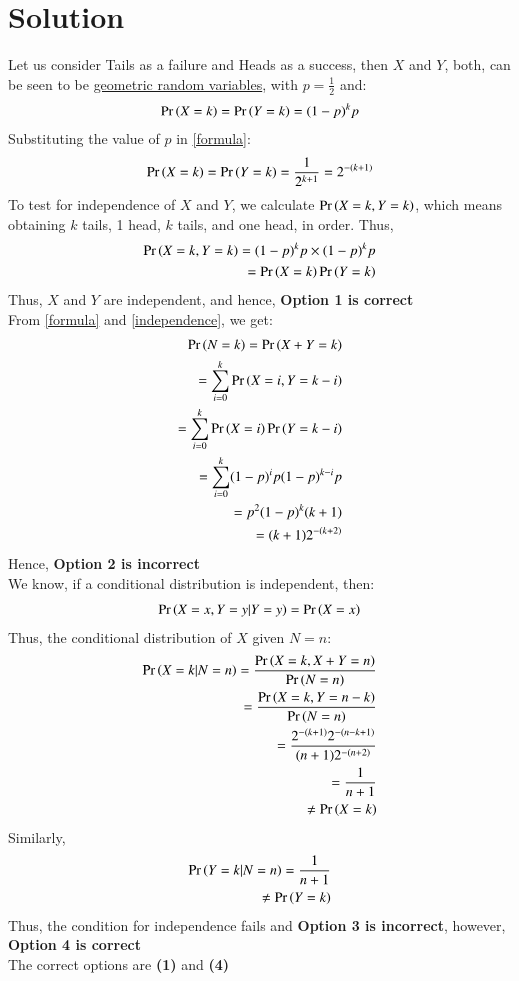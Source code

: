 \documentclass[journal,12pt,twocolumn]{IEEEtran}
\begin{document}
\section{Solution}
Let us consider Tails as a failure and Heads as a success, then $X$ and $Y$, both, can be seen to be \underline{geometric random variables}, with $p = \frac{1}{2}$ and:
\begin{align}
    \Pr\left(X = k\right) = \Pr\left(Y = k\right) = (1-p)^k p  
    \label{formula}
\end{align}
Substituting the value of $p$ in \eqref{formula}:
\begin{align}
    \Pr\left(X = k\right) = \Pr\left(Y = k\right) = \frac{1}{2^{k+1}} = 2^{-(k+1)}
\end{align}
To test for independence of $X$ and $Y$, we calculate $\Pr\left(X = k, Y = k\right)$, which means obtaining $k$ tails, 1 head, $k$ tails, and one head, in order. Thus,
\begin{align}
    \Pr\left(X = k,Y = k\right) = (1-p)^k p \times (1-p)^k p\\
    =\Pr\left(X = k\right)\Pr\left(Y = k\right)
    \label{independence}
    \end{align}
    Thus, $X$ and $Y$ are independent, and hence, \textbf{Option 1 is correct}\\
    From \eqref{formula} and \eqref{independence}, we get:
\begin{align}
    \Pr\left(N = k\right) = \Pr\left(X+Y = k\right)\\
    = \sum_{i=0}^k\Pr\left(X = i, Y = k-i\right) \\
    = \sum_{i=0}^k\Pr\left(X = i\right) \Pr\left(Y = k-i\right)\\
    =\sum_{i=0}^k (1-p)^i p (1-p)^{k-i} p\\
    = p^2(1-p)^k (k+1)\\
    =(k+1) 2^{-(k+2)}
\end{align}
Hence, \textbf{Option 2 is incorrect}\\
We know, if a conditional distribution is independent, then:
\begin{align}
    \Pr\left(X = x,Y=y | Y=y\right) = \Pr\left(X=x\right)
\end{align}
Thus, the conditional distribution of $X$ given $N=n$:
\begin{align}
    \Pr\left(X=k|N=n\right) = \frac{\Pr\left(X=k,X+Y=n\right)}{\Pr\left(N=n\right)}\\
    =\frac{\Pr\left(X=k,Y=n-k\right)}{\Pr\left(N=n\right)}\\
    =\frac{2^{-(k+1)}2^{-(n-k+1)}}{(n+1) 2^{-(n+2)}}\\
    = \frac{1}{n+1} \\
    \neq \Pr\left(X = k\right)
\end{align}
Similarly,
\begin{align}
    \Pr\left(Y=k|N=n\right) = \frac{1}{n+1}\\
    \neq \Pr\left(Y=k\right)
\end{align}
Thus, the condition for independence fails and \textbf{Option 3 is incorrect}, however, \textbf{Option 4 is correct}\\

The correct options are \textbf{(1)} and \textbf{(4)}
\end{document}
